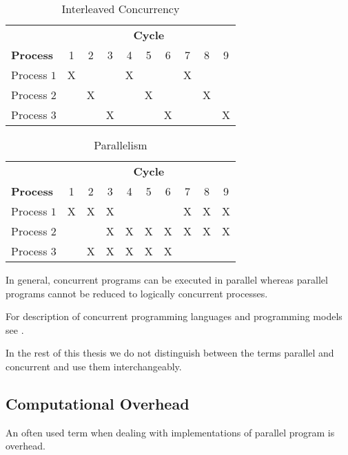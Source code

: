 \begin{table}[h!b!p!]
\caption{Interleaved Concurrency}
\centering
\begin{tabular}{|l|c|c|c|c|c|c|c|c|c|}
\hline
 & \multicolumn{9}{|c|}{\textbf{Cycle}} \\
\textbf{Process}
	& 1
	& 2
	& 3
        & 4
        & 5
        & 6
        & 7
        & 8
        & 9
        \\ \hline 
Process $1$ & X &   &   & X &   &   & X &   &   \\ \hline
Process $2$ &   & X &   &   & X &   &   & X &   \\ \hline
Process $3$ &   &   & X &   &   & X &   &   & X \\ \hline
\end{tabular}
\label{tab:concurrency}
\end{table}

\begin{table}[h!b!p!]
\caption{Parallelism}
\centering
\begin{tabular}{|l|c|c|c|c|c|c|c|c|c|}
\hline
 & \multicolumn{9}{|c|}{\textbf{Cycle}} \\
\textbf{Process}
	& 1
	& 2
	& 3
        & 4
        & 5
        & 6
        & 7
        & 8
        & 9
        \\ \hline 
Process $1$ & X & X & X &   &   &   & X & X & X \\ \hline
Process $2$ &   &   & X & X & X & X & X & X & X \\ \hline
Process $3$ &   & X & X & X & X & X &   &   &   \\ \hline
\end{tabular}
\label{tab:parallelism}
\end{table}

In general, concurrent programs can be executed 
in parallel whereas parallel programs cannot be reduced to logically
concurrent processes. 

For description of concurrent programming languages and programming
models see \cite{gehani88:concurrentprog}.

In the rest of this thesis we do not distinguish between the terms
parallel and concurrent and use them interchangeably.

\subsection{Computational Overhead}

An often used term when dealing with implementations of parallel
program is overhead.

